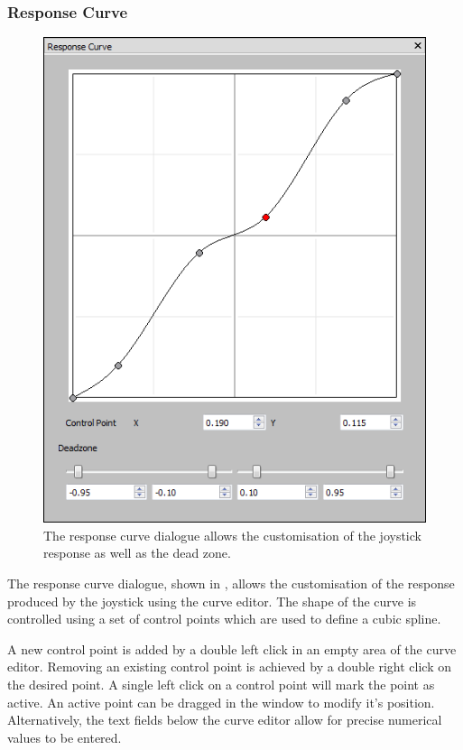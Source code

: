 \documentclass[a4, 10pt]{article}
\begin{document}
\subsubsection{Response Curve}

\begin{figure}[bt]
    \centering

    \includegraphics[width=0.75\linewidth]{images/action_response_curve}
    \caption{The response curve dialogue allows the customisation of the
        joystick response as well as the dead zone.}
    \label{fig:action_response_curve}
\end{figure}

The response curve dialogue, shown in ,
allows the customisation of the response produced by the joystick using
the curve editor. The shape of the curve is controlled using a set of
control points which are used to define a cubic spline.

A new control point is added by a double left click in an empty area of
the curve editor. Removing an existing control point is achieved by a
double right click on the desired point. A single left click on a
control point will mark the point as active. An active point can be
dragged in the window to modify it's position. Alternatively, the text
fields below the curve editor allow for precise numerical values to be
entered.
\end{document}
